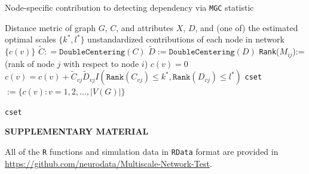 \documentclass[11pt]{article}
\theoremstyle{definition}
\begin{document}
\begin{algorithm}[H]
	\caption{Node-specific contribution to detecting dependency via \texttt{MGC} statistic}
	\begin{algorithmic}[1]
		\Require Distance metric of graph $G$, $C$, and attributes $X$, $D$, and (one of) the estimated optimal scales $\{ k^{*}, l^{*} \}$ 
		\Ensure  unstandardized contributions of each node in network $\{  c(v) \}$
		\State $\tilde{C} : = \texttt{DoubleCentering}(C)$
		\State $\tilde{D} := \texttt{DoubleCentering}(D)$
		\State \texttt{Rank}($M_{ij}$):= (rank of node $j$ with respect to node $i$)
		 
		\State $c(v) = 0$
		\Begin
		\State $c(v) =  c(v) + \tilde{C}_{vj} \tilde{D}_{v j} I(  \texttt{Rank}(C_{vj})  \leq k^{*}, \texttt{Rank}(D_{vj}) \leq l^{*} )$
		\End
		\EndFor
		\EndFor
		\State \texttt{cset} $:= \{ c(v) : v = 1,2, \ldots , |V(G)|  \}$	
		
		\Return  \texttt{cset}
		\EndFunction
	\end{algorithmic}
\end{algorithm}
\bigskip
\begin{center}
	{\large\bf SUPPLEMENTARY MATERIAL}
\end{center}

All of the \texttt{R} functions and simulation data in \texttt{RData} format are provided in \url{https://github.com/neurodata/Multiscale-Network-Test}.

	
\end{document}
